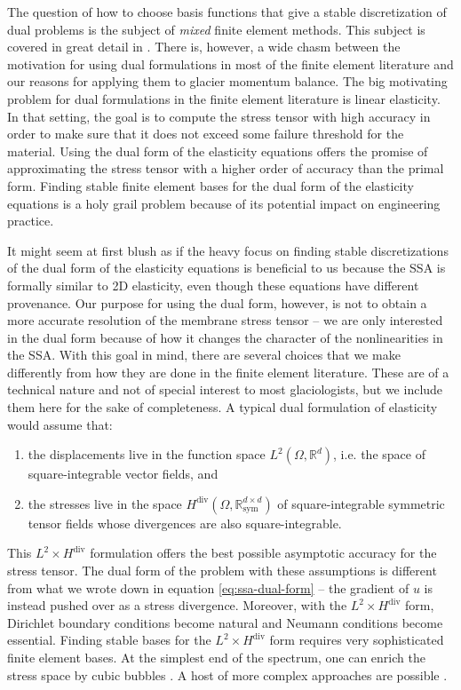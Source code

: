 \documentclass[twocolumn,letterpaper]{igs}
\begin{document}
The question of how to choose basis functions that give a stable discretization of dual problems is the subject of \emph{mixed} finite element methods.
This subject is covered in great detail in \citet{boffi2013mixed}.
There is, however, a wide chasm between the motivation for using dual formulations in most of the finite element literature and our reasons for applying them to glacier momentum balance.
The big motivating problem for dual formulations in the finite element literature is linear elasticity.
In that setting, the goal is to compute the stress tensor with high accuracy in order to make sure that it does not exceed some failure threshold for the material.
Using the dual form of the elasticity equations offers the promise of approximating the stress tensor with a higher order of accuracy than the primal form.
Finding stable finite element bases for the dual form of the elasticity equations is a holy grail problem because of its potential impact on engineering practice.

It might seem at first blush as if the heavy focus on finding stable discretizations of the dual form of the elasticity equations is beneficial to us because the SSA is formally similar to 2D elasticity, even though these equations have different provenance.
Our purpose for using the dual form, however, is not to obtain a more accurate resolution of the membrane stress tensor -- we are only interested in the dual form because of how it changes the character of the nonlinearities in the SSA.
With this goal in mind, there are several choices that we make differently from how they are done in the finite element literature.
These are of a technical nature and not of special interest to most glaciologists, but we include them here for the sake of completeness.
A typical dual formulation of elasticity would assume that:
\begin{enumerate}
    \item the displacements live in the function space $L^2(\Omega, \mathbb{R}^d)$, i.e. the space of square-integrable vector fields, and
    \item the stresses live in the space $H^{\text{div}}(\Omega, \mathbb{R}_{\text{sym}}^{d \times d})$ of square-integrable symmetric tensor fields whose divergences are also square-integrable.
\end{enumerate}
This $L^2 \times H^{\text{div}}$ formulation offers the best possible asymptotic accuracy for the stress tensor.
The dual form of the problem with these assumptions is different from what we wrote down in equation \eqref{eq:ssa-dual-form} -- the gradient of $u$ is instead pushed over as a stress divergence.
Moreover, with the $L^2 \times H^{\text{div}}$ form, Dirichlet boundary conditions become natural and Neumann conditions become essential.
Finding stable bases for the $L^2\times H^{\text{div}}$ form requires very sophisticated finite element bases.
At the simplest end of the spectrum, one can enrich the stress space by cubic bubbles \citep{brezzi1993mixed}.
A host of more complex approaches are possible \citep{arnold1984peers, arnold2002mixed}.
\end{document}
